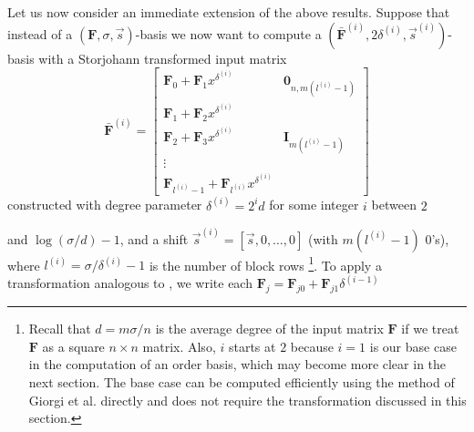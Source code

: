 Let us now consider an immediate extension of the above results. Suppose
that instead of a $\left(\mathbf{F},\sigma,\vec{s}\right)$-basis
we now want to compute a $(\bar{\mathbf{F}}^{\left(i\right)},2\delta^{\left(i\right)},\vec{s}^{\left(i\right)})$-basis
with a Storjohann transformed input matrix \[
\bar{\mathbf{F}}^{\left(i\right)}=\left[\begin{array}{c|c}
\mathbf{F}_{0}+\mathbf{F}_{1}x^{\delta^{\left(i\right)}} & \mathbf{0}_{n,m\left(l^{\left(i\right)}-1\right)}\\
\hline \mathbf{F}_{1}+\mathbf{F}_{2}x^{\delta^{\left(i\right)}}\\
\mathbf{F}_{2}+\mathbf{F}_{3}x^{\delta^{\left(i\right)}} & \mathbf{I}_{m\left(l^{\left(i\right)}-1\right)}\\
\vdots\\
\mathbf{F}_{l^{\left(i\right)}-1}+\mathbf{F}_{l^{\left(i\right)}}x^{\delta^{\left(i\right)}}\end{array}\right]\]
 constructed with degree parameter $\delta^{\left(i\right)}=2^{i}d$
for some integer $i$ between $2$%
\begin{comment}
the base case is $i=1$ and problem is not to be subdivided 
\end{comment}
{} and $\log\left(\sigma/d\right)-1$, and a shift $\vec{s}^{\left(i\right)}=[\vec{s},0,\dots,0]$
(with $m(l^{\left(i\right)}-1)$ 0's), where $l^{\left(i\right)}=\sigma/\delta^{\left(i\right)}-1$
is the number of block rows%
\footnote{Recall that $d=m\sigma/n$ is the average degree of the input matrix
$\mathbf{F}$ if we treat $\mathbf{F}$ as a square $n\times n$ matrix.
Also, $i$ starts at $2$ because $i=1$ is our base case in the computation
of an order basis, which may become more clear in the next section.
The base case can be computed efficiently using the method of Giorgi
et al. \citeyearpar{Giorgi2003} directly and does not require the
transformation discussed in this section.%
}. To apply a transformation analogous to ,
we write each $\mathbf{F}_{j}=\mathbf{F}_{j0}+\mathbf{F}_{j1}\delta^{\left(i-1\right)}$
